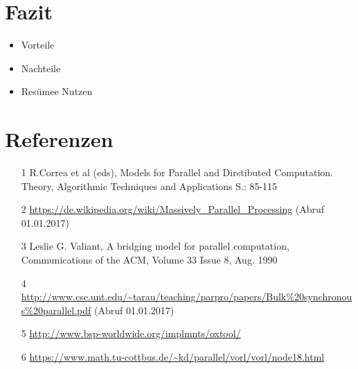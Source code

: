\documentclass[a4paper,10pt]{scrartcl}
\begin{document}
\section{Fazit}
\begin{itemize}
 \item Vorteile
 \item Nachteile
 \item Resümee Nutzen
\end{itemize}
\section{Referenzen}
\begin{itemize}
\item [1] R.Correa et al (eds), Models for Parallel and Dirstibuted Computation. Theory, Algorithmic Techniques and Applications S.: 85-115
\item [2] \url{https://de.wikipedia.org/wiki/Massively_Parallel_Processing} (Abruf 01.01.2017)
\item [3] Leslie G. Valiant, A bridging model for parallel computation, Communications of the ACM, Volume 33 Issue 8, Aug. 1990 
\item [4] \url{http://www.cse.unt.edu/~tarau/teaching/parpro/papers/Bulk%20synchronous%20parallel.pdf} (Abruf 01.01.2017)
\item [5] \url{http://www.bsp-worldwide.org/implmnts/oxtool/}
\item [6] \url{https://www.math.tu-cottbus.de/~kd/parallel/vorl/vorl/node18.html}
\end{itemize}
\end{document}

